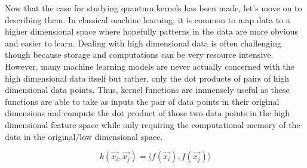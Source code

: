 \documentclass[
	a4paper, %
	10pt, %
	unnumberedsections, %
	twoside, %
]{LTJournalArticle}
\begin{document}
Now that the case for studying quantum kernels has been made, let's move on to describing them. In classical machine learning, it is common to map data to a higher dimensional space where 
hopefully patterns in the data are more obvious and easier to learn. Dealing with high dimensional data is often challenging though because storage and computations can be very resource intensive. 
However, many machine learning models are never actually concerned with the high dimensional data itself but rather, only the dot products of pairs of high dimensional data points. Thus, kernel 
functions are immensely useful as these functions are able to take as inputs the pair of data points in their original dimensions and compute the dot product of those two data points in the high 
dimensional feature space while only requiring the computational memory of the data in the original/low dimensional space.

\begin{equation}
	k(\vec{x_i}, \vec{x_j}) = \langle f(\vec{x_i}), f(\vec{x_j})\rangle
	\label{eq:kernel}
\end{equation}
\end{document}
